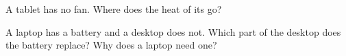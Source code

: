 \begin{exercise}[$\star\star$]\label{exo:g3:inside-the-computer:9}
A tablet has no fan. Where does the heat of its  go?
\end{exercise}

\begin{exercise}[$\star\star$]\label{exo:g3:inside-the-computer:10}
A laptop has a battery and a desktop  does not. Which part of the
desktop  does the battery replace? Why does a laptop need one?
\end{exercise}
